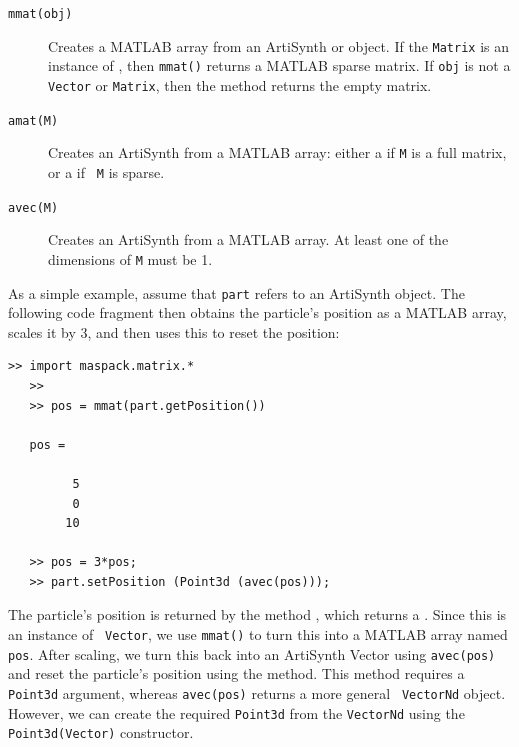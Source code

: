 \documentclass{article}
\begin{document}
\begin{description}

\item[{\tt mmat(obj)} ] \mbox{}

Creates a MATLAB array from an ArtiSynth 
 or 
object. If the {\tt Matrix} is an instance of 
, then
{\tt mmat()} returns a MATLAB sparse matrix. If {\tt obj} is not a
{\tt Vector} or {\tt Matrix}, then the method returns the empty
matrix.

\item[{\tt amat(M)} ] \mbox{}

Creates an ArtiSynth  from a MATLAB
array: either a  if {\tt M} is a
full matrix, or a  if {\tt
M} is sparse.

\item[{\tt avec(M)} ] \mbox{}

Creates an ArtiSynth  from a
MATLAB array. At least one of the dimensions of {\tt M} must be 1.

\end{description}

As a simple example, assume that {\tt part} refers to an ArtiSynth
object. The following code fragment 
then obtains the particle's position as a MATLAB array,
scales it by 3, and then uses this to reset the position:
%
\begin{lstlisting}[]
   >> import maspack.matrix.*
   >> 
   >> pos = mmat(part.getPosition())

   pos =

         5
         0
        10

   >> pos = 3*pos;
   >> part.setPosition (Point3d (avec(pos)));
\end{lstlisting}
%
The particle's position is returned by the method 
,
which returns a . 
Since this is an instance of {\tt
Vector}, we use {\tt mmat()} to turn this into a MATLAB array named {\tt
pos}.  After scaling, we turn this back into an ArtiSynth Vector using
{\tt avec(pos)} and reset the particle's position using the
method. This method requires a {\tt Point3d}
argument, whereas {\tt avec(pos)} returns a more general {\tt
VectorNd} object. However, we can create the required
{\tt Point3d} from the {\tt VectorNd} using the {\tt Point3d(Vector)}
constructor.
\end{document}
